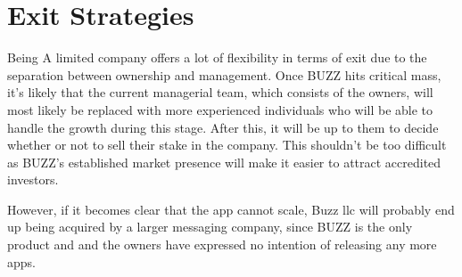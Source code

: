 \documentclass[12pt]{article}
\begin{document}
\section{Exit Strategies}

Being A limited company offers a lot of flexibility in terms of exit due to the separation between ownership and management. Once BUZZ hits critical mass, it's likely that the current managerial team, which consists of the owners, will most likely be replaced with more experienced individuals who will be able to handle the growth during this stage. After this, it will be up to them to decide whether or not to sell their stake in the company. This shouldn't be too difficult as BUZZ's established market presence will make it easier to attract accredited investors.

However, if it becomes clear that the app cannot scale, Buzz llc will probably end up being acquired by a larger messaging company, since BUZZ is the only product and and the owners have expressed no intention of releasing any more apps.


\newpage



\newpage

\renewcommand*\appendixpagename{\headingfont\HUGE\bfseries\scshape\color{color1} Appendices}
\end{document}
